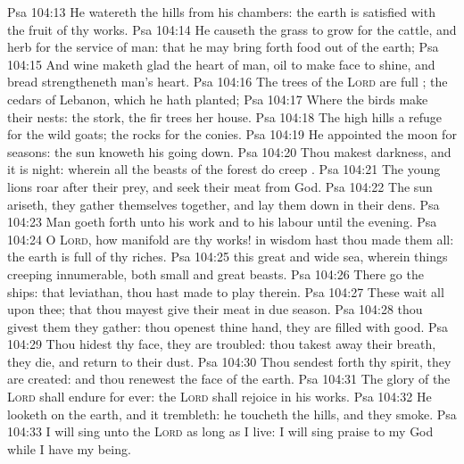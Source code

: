 \vs Psa 104:13 He watereth the hills from his chambers: the earth is satisfied with the fruit of thy works.
\vs Psa 104:14 He causeth the grass to grow for the cattle, and herb for the service of man: that he may bring forth food out of the earth;
\vs Psa 104:15 And wine  maketh glad the heart of man,  oil to make  face to shine, and bread  strengtheneth man's heart.
\vs Psa 104:16 The trees of the \textsc{Lord} are full ; the cedars of Lebanon, which he hath planted;
\vs Psa 104:17 Where the birds make their nests:  the stork, the fir trees  her house.
\vs Psa 104:18 The high hills  a refuge for the wild goats;  the rocks for the conies.
\vs Psa 104:19 He appointed the moon for seasons: the sun knoweth his going down.
\vs Psa 104:20 Thou makest darkness, and it is night: wherein all the beasts of the forest do creep .
\vs Psa 104:21 The young lions roar after their prey, and seek their meat from God.
\vs Psa 104:22 The sun ariseth, they gather themselves together, and lay them down in their dens.
\vs Psa 104:23 Man goeth forth unto his work and to his labour until the evening.
\vs Psa 104:24 O \textsc{Lord}, how manifold are thy works! in wisdom hast thou made them all: the earth is full of thy riches.
\vs Psa 104:25  this great and wide sea, wherein  things creeping innumerable, both small and great beasts.
\vs Psa 104:26 There go the ships:  that leviathan,  thou hast made to play therein.
\vs Psa 104:27 These wait all upon thee; that thou mayest give  their meat in due season.
\vs Psa 104:28  thou givest them they gather: thou openest thine hand, they are filled with good.
\vs Psa 104:29 Thou hidest thy face, they are troubled: thou takest away their breath, they die, and return to their dust.
\vs Psa 104:30 Thou sendest forth thy spirit, they are created: and thou renewest the face of the earth.
\vs Psa 104:31 The glory of the \textsc{Lord} shall endure for ever: the \textsc{Lord} shall rejoice in his works.
\vs Psa 104:32 He looketh on the earth, and it trembleth: he toucheth the hills, and they smoke.
\vs Psa 104:33 I will sing unto the \textsc{Lord} as long as I live: I will sing praise to my God while I have my being.
